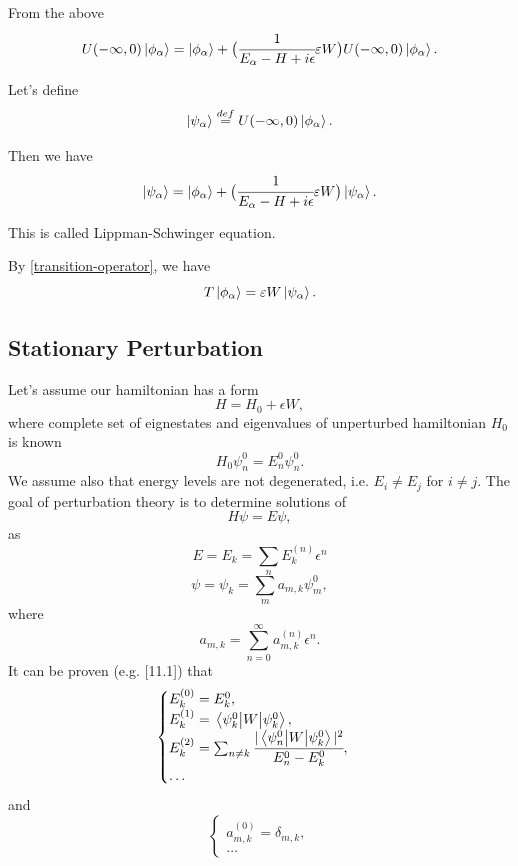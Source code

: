\documentclass[main.tex]{subfiles}
\begin{document}
From the above
\begin{equation}
U(-\infty, 0) \ket{\phi_\alpha} = \ket{\phi_\alpha} + \big(\cfrac{1}{E_\alpha - H + i\eepsilon}\epsilon W\big)U(-\infty, 0) \ket{\phi_\alpha}.
\end{equation}

Let's define
\begin{equation}
\ket{\psi_\alpha} \stackrel{def}{=} U(-\infty, 0) \ket{\phi_\alpha}.
\end{equation}

Then we have
\begin{equation}
\ket{\psi_\alpha} = \ket{\phi_\alpha} + \big(\cfrac{1}{E_\alpha - H + i\eepsilon}\epsilon W\big)\ket{\psi_\alpha}.
\end{equation}

This is called Lippman-Schwinger equation.

By \ref{transition-operator}, we have
\begin{equation}
T\ket{\phi_\alpha} = \varepsilon W \ket{\psi_\alpha}. 
\end{equation}

\subsection{Stationary Perturbation}
Let's assume our hamiltonian has a form
\begin{equation}
H = H_0 + \epsilon W,
\end{equation}
where complete set of eignestates and eigenvalues of unperturbed hamiltonian $H_0$ is known
\begin{equation}
H_0 \psi^0_n = E^0_n \psi^0_n.
\end{equation}
We assume also that energy levels are not degenerated, i.e.
$E_i \not= E_j$ for $i\not=j$.
The goal of perturbation theory is to determine solutions of 
\begin{equation}
H\psi = E \psi,
\end{equation}
as
\begin{equation}
E = E_k = \sum_{n} E^{(n)}_k\epsilon^n
\end{equation} 
\begin{equation}
\psi = \psi_k = \sum_{m}a_{m,k} \psi_m^0, 
\end{equation}
where 
\begin{equation}
a_{m,k} = \sum_{n=0}^\infty a^{(n)}_{m,k} \epsilon^n. 
\end{equation}
It can be proven (e.g. \cite{walter-greiner2001}[11.1]) that
\begin{equation}
\begin{cases}
E_k^{(0)} = E^0_k, \\
E_k^{(1)} = \mel{\psi_k^0}{W}{\psi_k^0},\\
E_k^{(2)} = \sum_{n\not=k} \cfrac{|\mel{\psi_n^0}{W}{\psi_k^0}|^2}{E^0_n - E^0_k},\\
\dots
\end{cases}
\end{equation}
and
\begin{equation}
\begin{cases}
a^{(0)}_{m, k} = \delta_{m,k},\\
\dots
\end{cases}
\end{equation}
\end{document}
